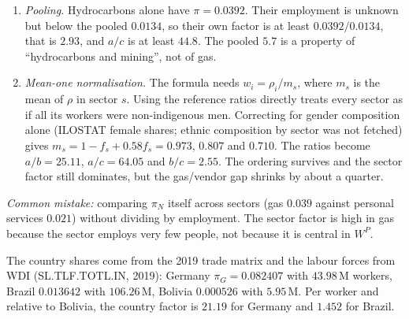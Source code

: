 \documentclass[../solutions_manual.tex]{subfiles}
\begin{document}
\begin{enumerate}
\item \emph{Pooling.} Hydrocarbons alone have $\pi = 0.0392$. Their employment is unknown but below the pooled $0.0134$, so their own factor is at least $0.0392/0.0134$, that is $2.93$, and $a/c$ is at least $44.8$. The pooled $5.7$ is a property of ``hydrocarbons and mining'', not of gas.
\item \emph{Mean-one normalisation.} The formula needs $w_i = \rho_i/m_s$, where $m_s$ is the mean of $\rho$ in sector $s$. Using the reference ratios directly treats every sector as if all its workers were non-indigenous men. Correcting for gender composition alone (ILOSTAT female shares; ethnic composition by sector was not fetched) gives $m_s = 1 - f_s + 0.58 f_s = 0.973$, $0.807$ and $0.710$. The ratios become $a/b = 25.11$, $a/c = 64.05$ and $b/c = 2.55$. The ordering survives and the sector factor still dominates, but the gas/vendor gap shrinks by about a quarter.
\end{enumerate}
\emph{Common mistake:} comparing $\pi_N$ itself across sectors (gas $0.039$ against personal services $0.021$) without dividing by employment. The sector factor is high in gas because the sector employs very few people, not because it is central in $W^P$.


 The country shares come from the 2019 trade matrix and the labour forces from WDI (SL.TLF.TOTL.IN, 2019): Germany $\pi_G = 0.082407$ with $43.98$\,M workers, Brazil $0.013642$ with $106.26$\,M, Bolivia $0.000526$ with $5.95$\,M. Per worker and relative to Bolivia, the country factor is $21.19$ for Germany and $1.452$ for Brazil.
\end{document}
